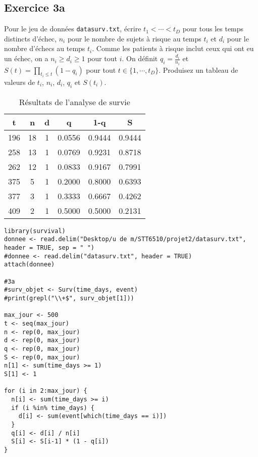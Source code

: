 \documentclass[../main.tex]{subfiles}
\begin{document}
\begin{CJK*}{UTF8}{gbsn}
\section*{Exercice 3a}
Pour le jeu de données 
\texttt{datasurv.txt}, 
écrire $t_1 < \cdots < t_D$ pour tous les temps distincts d'échec, 
$n_i$ pour le nombre de sujets à risque au temps $t_i$
et $d_i$ pour le nombre d'échecs au temps $t_i$.
Comme les patients à risque inclut ceux qui ont eu un échec,
on a $n_i \geqslant d_i \geqslant 1$ pour tout $i$.
On définit $q_i = \frac{d_i}{n_i}$ et $S(t) = \prod_{t_i \leqslant t} (1 - q_i)$
pour tout $t \in \{1, \cdots, t_D\}$.
Produisez un tableau de valeurs de $t_i$, $n_i$, $d_i$, $q_i$ et $S(t_i)$.

\begin{table}[h]
\centering
\begin{tabular}{|c|c|c|c|c|c|}
\hline
t & n & d & q & 1-q & S \\ \hline
196 & 18 & 1 & 0.0556 & 0.9444 & 0.9444 \\ \hline
258 & 13 & 1 & 0.0769 & 0.9231 & 0.8718 \\ \hline
262 & 12 & 1 & 0.0833 & 0.9167 & 0.7991 \\ \hline
375 & 5 & 1 & 0.2000 & 0.8000 & 0.6393 \\ \hline
377 & 3 & 1 & 0.3333 & 0.6667 & 0.4262 \\ \hline
409 & 2 & 1 & 0.5000 & 0.5000 & 0.2131 \\ \hline
\end{tabular}
\caption{Résultats de l'analyse de survie}
\label{table:surv_analysis}
\end{table}

\begin{lstlisting}
library(survival)
donnee <- read.delim("Desktop/u de m/STT6510/projet2/datasurv.txt", header = TRUE, sep = " ")
#donnee <- read.delim("datasurv.txt", header = TRUE)
attach(donnee)

#3a
#surv_objet <- Surv(time_days, event)
#print(grepl("\\+$", surv_objet[1]))

max_jour <- 500
t <- seq(max_jour)
n <- rep(0, max_jour)
d <- rep(0, max_jour)
q <- rep(0, max_jour)
S <- rep(0, max_jour)
n[1] <- sum(time_days >= 1)
S[1] <- 1

for (i in 2:max_jour) {
  n[i] <- sum(time_days >= i)
  if (i %in% time_days) {
    d[i] <- sum(event[which(time_days == i)])
  } 
  q[i] <- d[i] / n[i]
  S[i] <- S[i-1] * (1 - q[i])
}


\end{lstlisting}
\end{CJK*}
\end{document}
